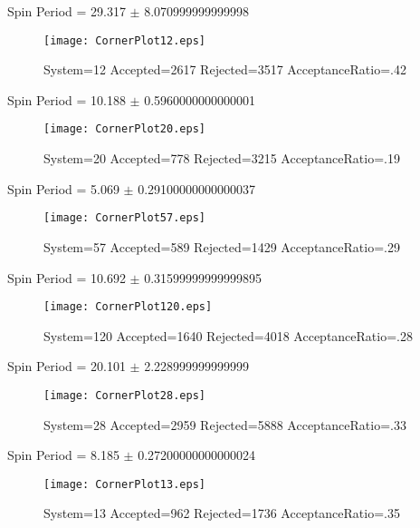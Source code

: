 \documentclass[10pt]{article}
\begin{document}
\newpage
\begin{center}
        Spin Period = 29.317 $\pm$ 8.070999999999998
        \end{center}
\begin{figure}[h] 
        \texttt{[image: CornerPlot12.eps]}
        \caption{System=12 Accepted=2617 Rejected=3517 AcceptanceRatio=.42}
        \label{S12}
        \centering
        \end{figure}
\newpage
\begin{center}
        Spin Period = 10.188 $\pm$ 0.5960000000000001
        \end{center}
\begin{figure}[h] 
        \texttt{[image: CornerPlot20.eps]}
        \caption{System=20 Accepted=778 Rejected=3215 AcceptanceRatio=.19}
        \label{S20}
        \centering
        \end{figure}
\newpage
\begin{center}
        Spin Period = 5.069 $\pm$ 0.29100000000000037
        \end{center}
\begin{figure}[h] 
        \texttt{[image: CornerPlot57.eps]}
        \caption{System=57 Accepted=589 Rejected=1429 AcceptanceRatio=.29}
        \label{S57}
        \centering
        \end{figure}
\newpage
\begin{center}
        Spin Period = 10.692 $\pm$ 0.31599999999999895
        \end{center}
\begin{figure}[h] 
        \texttt{[image: CornerPlot120.eps]}
        \caption{System=120 Accepted=1640 Rejected=4018 AcceptanceRatio=.28}
        \label{S120}
        \centering
        \end{figure}
\newpage
\begin{center}
        Spin Period = 20.101 $\pm$ 2.228999999999999
        \end{center}
\begin{figure}[h] 
        \texttt{[image: CornerPlot28.eps]}
        \caption{System=28 Accepted=2959 Rejected=5888 AcceptanceRatio=.33}
        \label{S28}
        \centering
        \end{figure}
\newpage
\begin{center}
        Spin Period = 8.185 $\pm$ 0.27200000000000024
        \end{center}
\begin{figure}[h] 
        \texttt{[image: CornerPlot13.eps]}
        \caption{System=13 Accepted=962 Rejected=1736 AcceptanceRatio=.35}
        \label{S13}
        \centering
        \end{figure}
\end{document}

